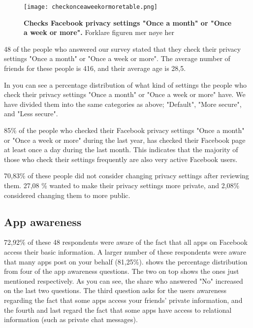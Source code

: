 \begin{figure}[h!]
\centering
\texttt{[image: checkonceaweekormoretable.png]}
\caption[Checks Facebook privacy settings "Once a month" or "Once a week or more"]{\textbf{Checks Facebook privacy settings "Once a month" or "Once a week or more".} Forklare figuren mer nøye her} 
\label{fig:onceaweekormore}
\end{figure}

48 of the people who answered our survey stated that they check their privacy settings "Once a month" or "Once a week or more". The average number of friends for these people is 416, and their average age is 28,5. 

In  you can see a percentage distribution of what kind of settings the people who check their privacy settings "Once a month" or "Once a week or more" have. We have divided them into the same categories as above; "Default", "More secure", and "Less secure".  

85\% of the people who checked their Facebook privacy settings "Once a month" or "Once a week or more" during the last year, has checked their Facebook page at least once a day during the last month. This indicates that the majority of those who check their settings frequently are also very active Facebook users. 

70,83\% of these people did not consider changing privacy settings after reviewing them. 27,08 \% wanted to make their privacy settings more private, and 2,08\% considered changing them to more public. 



\subsection{App awareness}
72,92\% of these 48 respondents were aware of the fact that all apps on Facebook access their basic information. A larger number of these respondents were aware that many apps post on your behalf (81,25\%).  shows the percentage distribution from four of the app awareness questions. The two on top shows the ones just mentioned respectively. As you can see, the share who answered "No" increased on the last two questions. The third question asks for the users awareness regarding the fact that some apps access your friends' private information, and the fourth and last regard the fact that some apps have access to relational information (such as private chat messages).  

